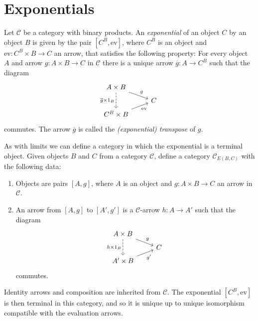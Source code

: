 \documentclass[article, a4paper, 11pt, oneside]{memoir}
\numberwithin{equation}{chapter}
\newcommand{\cat}[1]{\mathcal{#1}}
\newcommand{\catC}{\cat{C}}
\theoremstyle{myexample}
\theoremstyle{myexamplebreak}
\begin{document}
\chapter{Exponentials}

\newcommand{\eval}{\mathrm{ev}}

\begin{definition}[Exponentials]
    Let $\catC$ be a category with binary products. An \emph{exponential} of an object $C$ by an object $B$ is given by the pair\footnotemark{} $[C^B, \eval]$, where $C^B$ is an object and $\eval \colon C^B \times B \to C$ an arrow, that satisfies the following property: For every object $A$ and arrow $g \colon A \times B \to C$ in $\catC$ there is a unique arrow $\overline g \colon A \to C^B$ such that the diagram
    \begin{equation*}
        \begin{tikzcd}[row sep=tiny]
            A \times B
                \ar[dd, "\overline g \times 1_B", swap, dashed]
                \ar[dr, "g"]
            \\
            & C
            \\
            C^B \times B
                \ar[ur, "\eval", swap]
        \end{tikzcd}
    \end{equation*}
    commutes. The arrow $\overline g$ is called the \emph{(exponential) transpose} of $g$.
\end{definition}
%
As with limits we can define a category in which the exponential is a terminal object. Given objects $B$ and $C$ from a category $\catC$, define a category $\catC_{E(B,C)}$ with the following data:
%
\begin{enumerate}
    \item Objects are pairs $[A, g]$, where $A$ is an object and $g \colon A \times B \to C$ an arrow in $\catC$.

    \item An arrow from $[A,g]$ to $[A',g']$ is a $\catC$-arrow $h \colon A \to A'$ such that the diagram
    \begin{equation*}
        \begin{tikzcd}[row sep=tiny]
            A \times B
                \ar[dd, "h \times 1_B", swap, dashed]
                \ar[dr, "g"]
            \\
            & C
            \\
            A' \times B
                \ar[ur, "g'", swap]
        \end{tikzcd}
    \end{equation*}
    commutes.
\end{enumerate}
%
Identity arrows and composition are inherited from $\catC$. The exponential $[C^B, \eval]$ is then terminal in this category, and so it is unique up to unique isomorphism compatible with the evaluation arrows.
\end{document}
